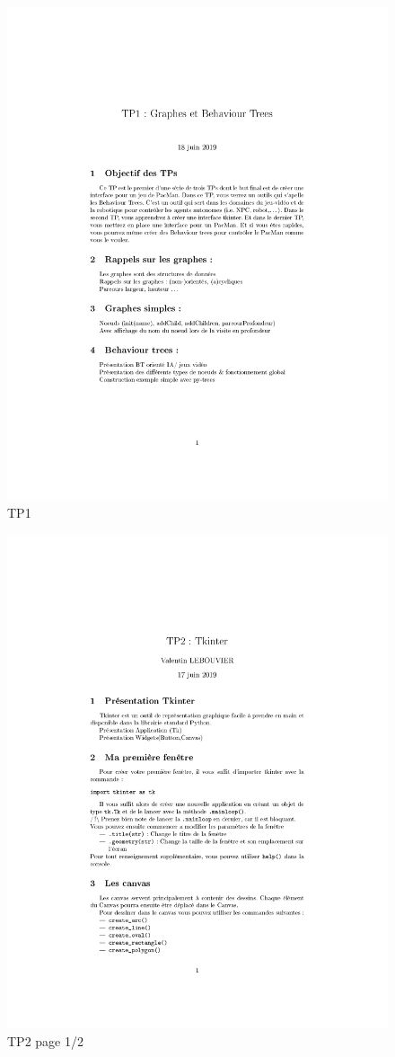\documentclass[11pt]{article}
\begin{document}
\begin{figure}[htb]
\centering
\includegraphics[width=.9\linewidth]{../TP/TP1/TP1.pdf}
\caption{\label{TP1}TP1}
\end{figure}


\begin{figure}[htb]
\centering
\includegraphics[width=.9\linewidth]{../TP/TP2/TP2.pdf}
\caption{\label{TP2}TP2 page 1/2}
\end{figure}
\end{document}
